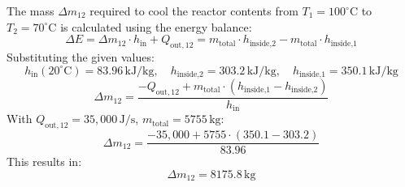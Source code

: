 The mass \( \Delta m_{12} \) required to cool the reactor contents from \( T_1 = 100^\circ\text{C} \) to \( T_2 = 70^\circ\text{C} \) is calculated using the energy balance:  
\[
\Delta E = \Delta m_{12} \cdot h_{\text{in}} + Q_{\text{out},12} = m_{\text{total}} \cdot h_{\text{inside,2}} - m_{\text{total}} \cdot h_{\text{inside,1}}
\]  
Substituting the given values:  
\[
h_{\text{in}}(20^\circ\text{C}) = 83.96 \, \text{kJ/kg}, \quad h_{\text{inside,2}} = 303.2 \, \text{kJ/kg}, \quad h_{\text{inside,1}} = 350.1 \, \text{kJ/kg}
\]  
\[
\Delta m_{12} = \frac{-Q_{\text{out},12} + m_{\text{total}} \cdot (h_{\text{inside,1}} - h_{\text{inside,2}})}{h_{\text{in}}}
\]  
With \( Q_{\text{out},12} = 35,000 \, \text{J/s} \), \( m_{\text{total}} = 5755 \, \text{kg} \):  
\[
\Delta m_{12} = \frac{-35,000 + 5755 \cdot (350.1 - 303.2)}{83.96}
\]  
This results in:  
\[
\Delta m_{12} = 8175.8 \, \text{kg}
\]